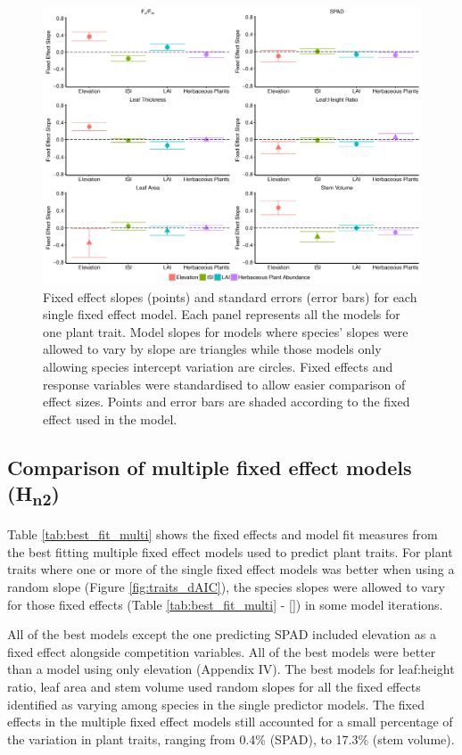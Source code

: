 \documentclass[a4paper,10pt,]{report}
\newcommand{\cmark}{\ding{51}}
\begin{document}
\begin{figure}[H]
\centering
\includegraphics[width = \textwidth]{slope_traits.pdf}
\caption{Fixed effect slopes (points) and standard errors (error bars) for each single fixed effect model. Each panel represents all the models for one plant trait. Model slopes for models where species' slopes were allowed to vary by slope are triangles while those models only allowing species intercept variation are circles. Fixed effects and response variables were standardised to allow easier comparison of effect sizes. Points and error bars are shaded according to the fixed effect used in the model.}
\label{fig:slope_traits}
\end{figure}

\subsection*{Comparison of multiple fixed effect models (H\textsubscript{n2})}
Table \ref{tab:best_fit_multi} shows the fixed effects and model fit measures from the best fitting multiple fixed effect models used to predict plant traits. For plant traits where one or more of the single fixed effect models was better when using a random slope (Figure \ref{fig:traits_dAIC}), the species slopes were allowed to vary for those fixed effects (Table \ref{tab:best_fit_multi} - [\cmark]) in some model iterations. 

All of the best models except the one predicting SPAD included elevation as a fixed effect alongside competition variables. All of the best models were better than a model using only elevation (Appendix IV). The best models for leaf:height ratio, leaf area and stem volume used random slopes for all the fixed effects identified as varying among species in the single predictor models. The fixed effects in the multiple fixed effect models still accounted for a small percentage of the variation in plant traits, ranging from 0.4\% (SPAD), to 17.3\% (stem volume).
\end{document}
